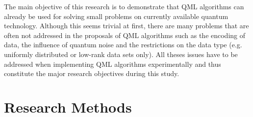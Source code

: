\documentclass[a4paper]{article}
\newcommand*{\0}{$\ket{0}$}
\newcommand*{\1}{$\ket{1}$}
\begin{document}
The main objective of this research is to demonstrate that QML algorithms can already be used for solving small problems on currently available quantum technology. Although this seems trivial at first, there are many problems that are often not addressed in the proposals of QML algorithms such as the encoding of data, the influence of quantum noise and the restrictions on the data type (e.g. uniformly distributed or low-rank data sets only). All theses issues have to be addressed when implementing QML algorithms experimentally and thus constitute the major research objectives during this study. 




\newpage
		
\section{Research Methods}
\label{sec:researchmethods}
\end{document}
